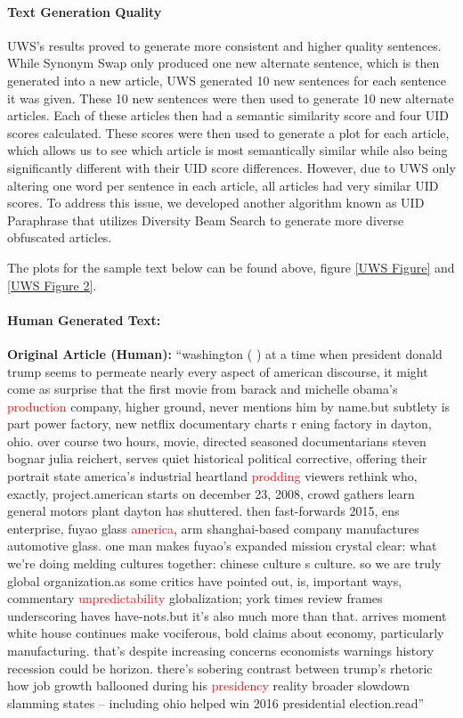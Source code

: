 \documentclass{article}
\begin{document}
\paragraph{Text Generation Quality}
UWS’s results proved to generate more consistent and higher quality sentences. While Synonym Swap only produced one new alternate sentence, which is then generated into a new article, UWS generated 10 new sentences for each sentence it was given. These 10 new sentences were then used to generate 10 new alternate articles. Each of these articles then had a semantic similarity score and four UID scores calculated. These scores were then used to generate a plot for each article, which allows us to see which article is most semantically similar while also being significantly different with their UID score differences.
However, due to UWS only altering one word per sentence in each article, all articles had very similar UID scores. To address this issue, we developed another algorithm known as UID Paraphrase that utilizes Diversity Beam Search to generate more diverse obfuscated articles.

The plots for the sample text below can be found above, figure \ref{UWS Figure} and \ref{UWS Figure 2}.
\paragraph{Human Generated Text:}
 \hfill \break \textbf{Original Article (Human):} “washington ( ) at a time when president donald trump seems to permeate nearly every aspect of american discourse, it might come as surprise that the first movie from barack and michelle obama's \textcolor{red}{production} company, higher ground, never mentions him by name.but subtlety is part power factory, new netflix documentary charts r ening factory in dayton, ohio. over course two hours, movie, directed seasoned documentarians steven bognar julia reichert, serves quiet historical political corrective, offering their portrait state america's industrial heartland \textcolor{red}{prodding} viewers rethink who, exactly, project.american starts on december 23, 2008, crowd gathers learn general motors plant dayton has shuttered. then fast-forwards 2015, ens enterprise, fuyao glass \textcolor{red}{america}, arm shanghai-based company manufactures automotive glass. one man makes fuyao's expanded mission crystal clear: what we're doing melding cultures together: chinese culture s culture. so we are truly global organization.as some critics have pointed out, is, important ways, commentary \textcolor{red}{unpredictability} globalization; york times review frames underscoring haves have-nots.but it's also much more than that. arrives moment white house continues make vociferous, bold claims about economy, particularly manufacturing. that's despite increasing concerns economists warnings history recession could be horizon. there's sobering contrast between trump's rhetoric how job growth ballooned during his \textcolor{red}{presidency} reality broader slowdown slamming states -- including ohio helped win 2016 presidential election.read”
 
\end{document}

